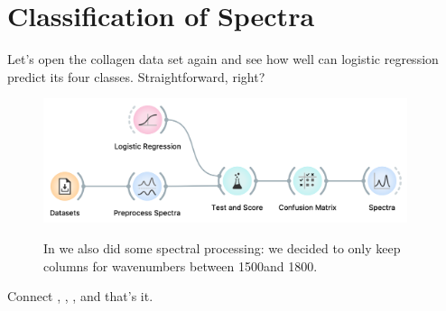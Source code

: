 \chapter{Classification of Spectra}
\label{ch:spectra_classification}

Let’s open the collagen data set again and see how well can logistic regression predict its four classes. Straightforward, right?

\begin{figure}[h]
    \includegraphics[width=0.95\textwidth]{sp_classification-fig1.png}
    \label{fig:spectra_classification-fig1}
    \caption{In  we also did some spectral processing: we decided to only keep columns for wavenumbers between 1500\wn and 1800\wn.}
\end{figure}

\noindent Connect , , ,  and that's it.

